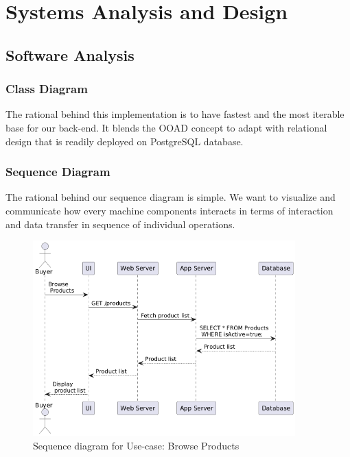 %
%
\chapter{Systems Analysis and Design}

\section{Software Analysis}

\subsection{Class Diagram}

The rational behind this implementation is to have fastest and the most iterable base for our back-end. It blends the OOAD concept to adapt with relational design that is readily deployed on PostgreSQL database.


\subsection{Sequence Diagram}

The rational behind our sequence diagram is simple. We want to visualize and communicate how every machine components interacts in terms of interaction and data transfer in sequence of individual operations.


\begin{figure}[!h]
	\centering
	\includegraphics[width=0.9\textwidth]{chapters/ch-04/300_usecase_browse.png} %
	\caption{Sequence diagram for Use-case: Browse Products}
	\label{fig:seq_01} %
\end{figure}

